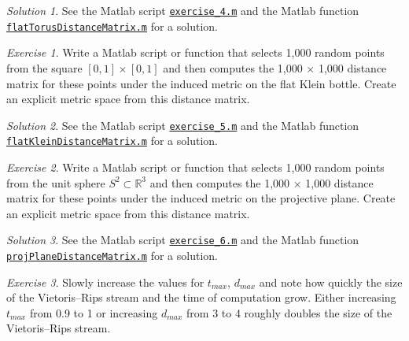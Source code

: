 \documentclass[amscd, amssymb, verbatim]{amsart}[12pt]
\theoremstyle{remark}
\theoremstyle{remark}
\newtheorem{exerciseSol}{Exercise}
\theoremstyle{remark}
\newtheorem*{solution}{Solution}
\begin{document}
\begin{solution}
See the Matlab script \href{https://github.com/appliedtopology/javaplex/tree/master/src/matlab/for_distribution/tutorial_solutions/exercise_4.m}{\texttt{exercise\_4.m}} and the Matlab function \href{https://github.com/appliedtopology/javaplex/tree/master/src/matlab/for_distribution/tutorial_solutions/flatTorusDistanceMatrix.m}{\texttt{flatTorusDistanceMatrix.m}} for a solution.
\end{solution}

\begin{exerciseSol}
Write a Matlab script or function that selects 1,000 random points from the square $[0, 1] \times [0, 1]$ and then computes the 1,000 $\times$ 1,000 distance matrix for these points under the induced metric on the flat Klein bottle. Create an explicit metric space from this distance matrix.
\end{exerciseSol}

\begin{solution}
See the Matlab script \href{https://github.com/appliedtopology/javaplex/tree/master/src/matlab/for_distribution/tutorial_solutions/exercise_5.m}{\texttt{exercise\_5.m}} and the Matlab function \href{https://github.com/appliedtopology/javaplex/tree/master/src/matlab/for_distribution/tutorial_solutions/flatKleinDistanceMatrix.m}{\texttt{flatKleinDistanceMatrix.m}} for a solution.
\end{solution}

\begin{exerciseSol}
Write a Matlab script or function that selects 1,000 random points from the unit sphere $S^2 \subset \mathbb{R}^3$ and then computes the 1,000 $\times$ 1,000 distance matrix for these points under the induced metric on the projective plane. Create an explicit metric space from this distance matrix. 
\end{exerciseSol}

\begin{solution}
See the Matlab script \href{https://github.com/appliedtopology/javaplex/tree/master/src/matlab/for_distribution/tutorial_solutions/exercise_6.m}{\texttt{exercise\_6.m}} and the Matlab function \href{https://github.com/appliedtopology/javaplex/tree/master/src/matlab/for_distribution/tutorial_solutions/projPlaneDistanceMatrix.m}{\texttt{projPlaneDistanceMatrix.m}} for a solution.
\end{solution}

\begin{exerciseSol}
Slowly increase the values for $t_{max}$, $d_{max}$ and note how quickly the size of the Vietoris--Rips stream and the time of computation grow. Either increasing $t_{max}$ from 0.9 to 1 or increasing $d_{max}$ from 3 to 4 roughly doubles the size of the Vietoris--Rips stream.
\end{exerciseSol}
\end{document}
